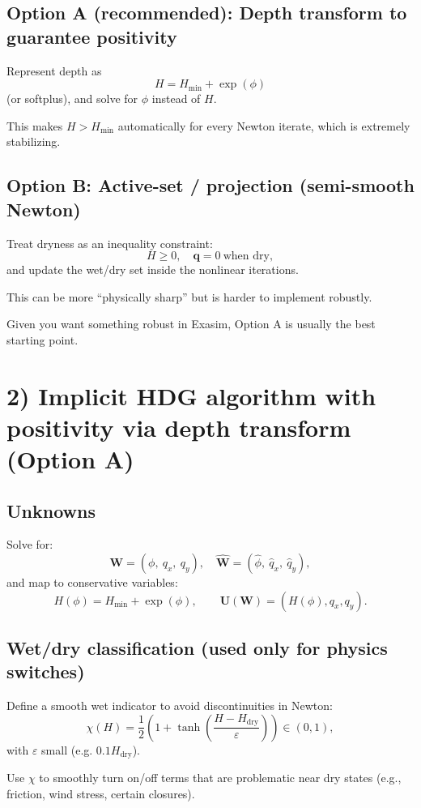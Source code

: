 \documentclass[11pt]{article}
\begin{document}
\subsection*{Option A (recommended): Depth transform to guarantee positivity}

Represent depth as
\[
H = H_{\min} + \exp(\phi)
\]
(or softplus), and solve for $\phi$ instead of $H$.

This makes $H>H_{\min}$ automatically for every Newton iterate, which is extremely stabilizing.

\subsection*{Option B: Active-set / projection (semi-smooth Newton)}

Treat dryness as an inequality constraint:
\[
H \ge 0,\quad \mathbf{q}=0\ \text{when dry},
\]
and update the wet/dry set inside the nonlinear iterations.

This can be more ``physically sharp'' but is harder to implement robustly.

Given you want something robust in Exasim, Option A is usually the best starting point.

\section*{2) Implicit HDG algorithm with positivity via depth transform (Option A)}

\subsection*{Unknowns}

Solve for:
\[
\mathbf{W}=(\phi,\ q_x,\ q_y),\quad \widehat{\mathbf{W}}=(\widehat{\phi},\ \widehat{q}_x,\ \widehat{q}_y),
\]
and map to conservative variables:
\[
H(\phi)=H_{\min}+\exp(\phi),\qquad \mathbf{U}(\mathbf{W})=(H(\phi),q_x,q_y).
\]

\subsection*{Wet/dry classification (used only for physics switches)}

Define a smooth wet indicator to avoid discontinuities in Newton:
\[
\chi(H)=\frac{1}{2}\left(1+\tanh\left(\frac{H-H_{\text{dry}}}{\varepsilon}\right)\right)\in(0,1),
\]
with $\varepsilon$ small (e.g. $0.1H_{\text{dry}}$).

Use $\chi$ to smoothly turn on/off terms that are problematic near dry states (e.g., friction, wind stress, certain closures).
\end{document}
